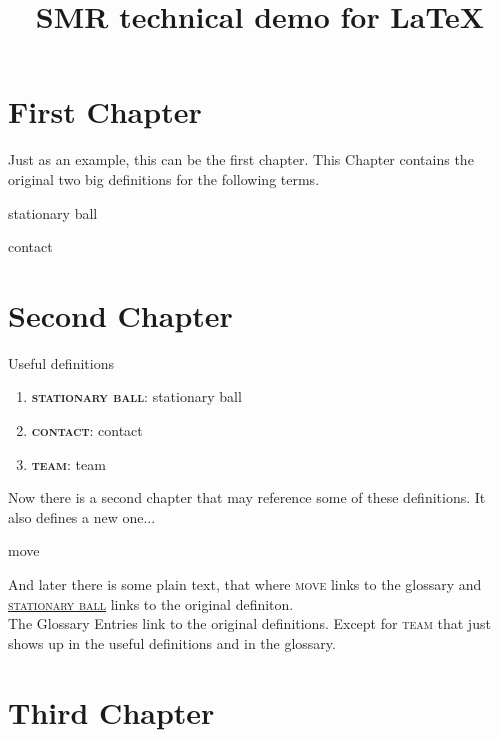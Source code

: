 \documentclass[fontsize=11pt, paper=a4]{report}
\newcommand{\refformat}[1]{{\textsc{#1}}}			 %
\newcommand{\defformat}[1]{{\textbf{\refformat{#1}}}}%
\newcommand{\dtterm}[1]{
\begin{Definition}[name=\defformat{#1}]
	\label{d:#1}
	 \glsdesc*{#1} %
\end{Definition}
}
\newcommand{\dref}[1]{\refformat{\hyperref[d:#1]{#1}}}
\newcommand{\gref}[1]{\refformat{\gls{#1}}} %
\newcommand{\tterm}[1]{%
	\defformat{#1}: \glsdesc*{#1} %
}
\newcommand{\recap}[1]{\item{\tterm{#1}}}
\begin{document}
\title{SMR technical demo for \LaTeX}
\maketitle

\pagestyle{plain}%

\chapter{First Chapter}
Just as an example, this can be the first chapter. This Chapter contains the original two big definitions for the following terms.
\dtterm{stationary ball}
\dtterm{contact}

\newpage

\chapter{Second Chapter}
Useful definitions
\begin{enumerate}
	\recap{stationary ball}
	\recap{contact}
	\recap{team}
\end{enumerate}
Now there is a second chapter that may reference some of these definitions. It also defines a new one...
\dtterm{move}
 And later there is some plain text, that where \gref{move} links to the glossary and \dref{stationary ball} links to the original definiton.\\
 The Glossary Entries link to the original definitions. Except for \gref{team} that just shows up in the useful definitions and in the glossary.

\chapter{Third Chapter}

\clearpage

\printglossary[title=Definitions, toctitle=List of terms]%
\end{document}
